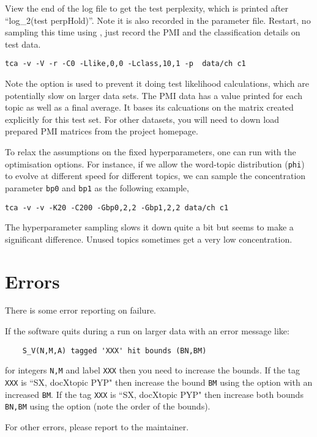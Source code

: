 \documentclass[a4paper,english]{article}
\begin{document}
View the end of the log file to get the test perplexity,
which is printed after ``log\_2(test perpHold)''.
Note it is also recorded in the parameter file.
Restart, no sampling this time using , just record the 
PMI and the classification details on test data.
\begin{verbatim}
tca -v -V -r -C0 -Llike,0,0 -Lclass,10,1 -p  data/ch c1
\end{verbatim}

Note the  option is used to prevent it 
doing test likelihood calculations, which are potentially slow
on larger data sets.
The PMI data has a value printed for each topic as well as a 
final average.  It bases its calcuations on the matrix
 created explicitly for this test set.
For other datasets, you will need to down load prepared
PMI matrices from the project homepage.

To relax the assumptions on the fixed hyperparameters, one can run with 
the optimisation options. For instance, if we allow the word-topic distribution (\texttt{phi}) to 
evolve at different speed for different topics, we can sample the concentration parameter \texttt{bp0} and \texttt{bp1} as the following example,
\begin{verbatim}
tca -v -v -K20 -C200 -Gbp0,2,2 -Gbp1,2,2 data/ch c1
\end{verbatim}
The hyperparameter sampling slows it down quite a bit but seems to
make a significant difference.  Unused topics sometimes
get a very low concentration.

\section{Errors}

There is some error reporting on failure.

If the software quits during a run on larger data with an
error message like:
\begin{verbatim}
    S_V(N,M,A) tagged 'XXX' hit bounds (BN,BM)
\end{verbatim}
for integers \texttt{N,M} and label \texttt{XXX} then you
need to increase the bounds.
If the tag \texttt{XXX} is ``SX, docXtopic PYP"
then increase the bound \texttt{BM} using the option
 with an increased \texttt{BM}.
If the tag \texttt{XXX} is ``SX, docXtopic PYP"
then increase both bounds \texttt{BN,BM} using the option
(note the order of the bounds).

For other errors, please report to the
maintainer.
\end{document}
